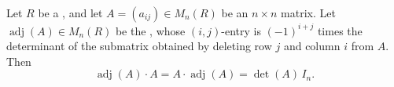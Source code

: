 \begin{proposition} \label{proposition:adjugate_formula_for_determinant_over_a_commutative_ring}
    Let $R$ be a , and let $A = (a_{ij}) \in M_n(R)$ be an $n \times n$ matrix. Let $\operatorname{adj}(A) \in M_n(R)$ be the  , whose $(i,j)$-entry is $(-1)^{i+j}$ times the determinant of the submatrix obtained by deleting row $j$ and column $i$ from $A$. Then
    $$\operatorname{adj}(A) \cdot A = A \cdot \operatorname{adj}(A) = \det(A) \, I_n.$$
\end{proposition}